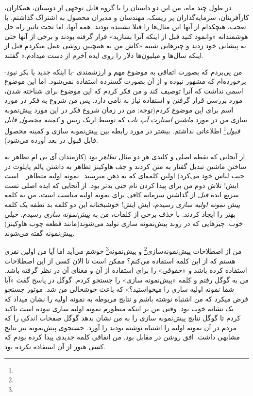 در طول چند ماه، من این دو داستان را با گروه قابل توجهی از دوستان،
همکاران، کارآفرینان، سرمایه‌گذاران پر ریسک، مهندسان و مدیران محصول به
اشتراک گذاشتم. با تعجب، هیچکدام از آنها این مثال‌ها را قبلا نشنیده
بودند. همه آنها، اما تحت تاثیر راه حل هوشمندانه «وانمود کنید قبل از
اینکه آنرا بسازید» قرار گرفته بودند و برخی از آنها حتی به پیشانی خود
زدند و چیزهایی شبیه «کاش من به همچنین روشی عمل میکردم قبل از اینکه
سال‌ها و میلیون‌ها دلار را روی ایده آخرم از دست میدادم.» گفتند.

من پی‌بردم که بصورت اتفاقی به موضوع مهم و ارزشمندی -با اینکه جدید یا بکر
نبود- برخورده‌ام که مشهور نبوده و از آن بصورت گسترده استفاده نمی‌شود.
اما این موضوع اسمی نداشت که آنرا توصیف کند و من فکر کردم که این موضوع
برای شناخته شدن، مورد بررسی قرار گرفتن و استفاده نیاز به نامی دارد. پس
من شروع به فکر در مورد اسم برای این موضوع کردم(توجه: من در زمان شروع فکر
در این مورد پیش‌نمونه سازی من در مورد \emph{ماشین استارت آپ ناب} که توسط
اریک ریس و \emph{کمینه محصول قابل قبول}\footnote{
   } اطلاعاتی نداشتم. بیشتر در مورد رابطه بین
پیش‌نمونه سازی و کمینه محصول قابل قبول در بعد آورده می‌شود).

از آنجایی که نقطه اصلی و کلیدی هر دو مثال \emph{تظاهر} بود (کارمندان آی
بی ام تظاهر به ساختن ماشین تبدیل گفتار به متن کردند و جف هاوکینز تظاهر
به داشتن پالم پایلوت در جیب لباس خود می‌کرد) اولین کلمه‌ای که به ذهن
میرسید\_‌نمونه اولیه متظاهر\_ است ایش! تلاش دوم من برای پیدا کردن نام
حتی بدتر بود. از آنجایی که ایده‌ اصلی تست سریع ایده \emph{قبل} از گذاشتن
سرمایه کافی برای نمونه اولیه مناسب است، من به کلمه \emph{پیش نمونه اولیه
سازی} رسیدم، ایش ایش! خوشبختانه این دو کلمه بد نطفه یک کلمه بهتر را
ایجاد کردند. با حذف برخی از کلمات، من به \emph{پیش‌نمونه سازی} رسیدم.
خیلی خوب. چیزهایی که در روند پیش‌نمونه سازی تولید می‌شوند(مانند قطعه چوب
هاوکینز) پیش‌نمونه گفته می‌شوند.

من از اصطلاحات پیش‌نمونه‌سازی\footnote{} و
پیش‌نمونه\footnote{} خوشم می‌آید اما آیا من اولین نفری
هستم که از این کلمه استفاده می‌کنم؟ ممکن است تا الان کسی از این اصطلاحات
استفاده کرده باشد و «حقوقی» را برای استفاده از آن و معنای آن در نظر
گرفته باشد. من به گوگل رفتم و کلمه «پیش‌نمونه سازی» را جستجو کردم. گوگل
در پاسخ گفت «آیا شما نمونه اولیه سازی را میخواستید؟» که باعث خوشحالی من
شد. موتور جستجو فرض میکرد که من اشتباه نوشته باشم و نتایج مربوطه به
نمونه اولیه را نشان میداد که یک نشانه خوب بود. وقتی من بر اینکه منظورم
نمونه اولیه سازی نبوده است تاکید کردم تا گوگل نتایج پیش‌نمونه سازی را به
من نشان بدهد گوگل صفحات اندکی را که مردم در آن نمونه اولیه را اشتباه
نوشته بودند را آورد. جستجوی پیش‌نمونه نیز نتایج مشابهی داشت. افق روشن در
مقابل بود. من اتفاقی کلمه جدیدی پیدا کرده بودم که کسی هنوز از آن استفاده
نکرده بود.


